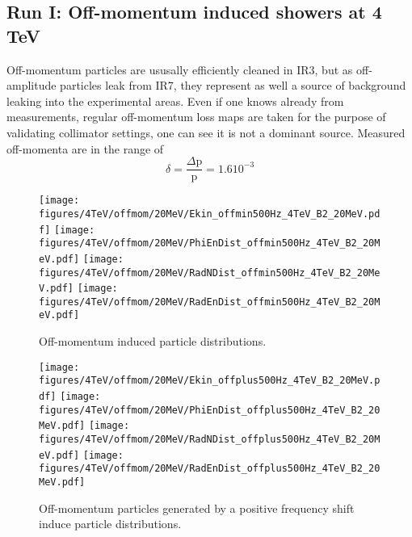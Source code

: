 \subsection{Run I: Off-momentum induced showers at 4 TeV}

Off-momentum particles are ususally efficiently cleaned in IR3, but as off-amplitude particles leak from IR7, they represent as well a source of background leaking into the experimental areas. Even if one knows already from measurements, regular off-momentum loss maps are taken for the purpose of validating collimator settings, one can see it is not a dominant source. Measured off-momenta are in the range of
\begin{equation}
  \delta = \frac{\Delta \mathrm{p}}{\mathrm{p}} = 1.6 10^{-3}
\end{equation}

\begin{figure}[!htb]
\begin{center}
  \texttt{[image: figures/4TeV/offmom/20MeV/Ekin\_offmin500Hz\_4TeV\_B2\_20MeV.pdf]}
  \texttt{[image: figures/4TeV/offmom/20MeV/PhiEnDist\_offmin500Hz\_4TeV\_B2\_20MeV.pdf]}
  \texttt{[image: figures/4TeV/offmom/20MeV/RadNDist\_offmin500Hz\_4TeV\_B2\_20MeV.pdf]}
  \texttt{[image: figures/4TeV/offmom/20MeV/RadEnDist\_offmin500Hz\_4TeV\_B2\_20MeV.pdf]}
\end{center}
\vspace{-0.6cm}
 \caption{Off-momentum induced particle distributions.
  \label{offmom4TeV}}
\end{figure}

\begin{figure}[!htb]
\begin{center}
  \texttt{[image: figures/4TeV/offmom/20MeV/Ekin\_offplus500Hz\_4TeV\_B2\_20MeV.pdf]}
  \texttt{[image: figures/4TeV/offmom/20MeV/PhiEnDist\_offplus500Hz\_4TeV\_B2\_20MeV.pdf]}
  \texttt{[image: figures/4TeV/offmom/20MeV/RadNDist\_offplus500Hz\_4TeV\_B2\_20MeV.pdf]}
  \texttt{[image: figures/4TeV/offmom/20MeV/RadEnDist\_offplus500Hz\_4TeV\_B2\_20MeV.pdf]}
\end{center}
\vspace{-0.6cm}
 \caption{Off-momentum particles generated by a positive frequency shift induce particle distributions.
  \label{offmom4TeV}}
\end{figure}


